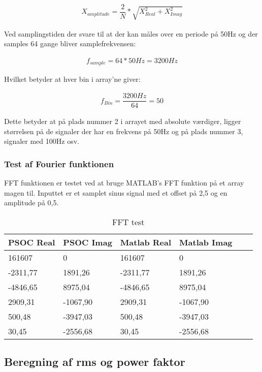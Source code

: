 \begin{align}
X_{amplitude} = \dfrac{2}{N}*\sqrt{X_{Real}^{2}+X_{Imag}^{2}}
\end{align} 	  


Ved samplingstiden der svare til at der kan måles over en periode på 50Hz og der samples 64 gange bliver samplefrekvensen:

\begin{align}
f_{sample} = 64 * 50Hz = 3200Hz
\end{align}   

Hvilket betyder at hver bin i array'ne giver:

\begin{align}
f_{Bin} = \dfrac{3200Hz}{64} = 50
\end{align}

Dette betyder at på plads nummer 2 i arrayet med absolute værdiger, ligger størrelsen på de signaler der har en frekvens på 50Hz og på plads nummer 3, signaler med 100Hz osv.

\subsubsection{Test af Fourier funktionen}
FFT funktionen er testet ved at bruge MATLAB's FFT funktion på et array magen til. Inputtet er et samplet sinus signal med et offset på 2,5 og en amplitude på 0,5.

\begin{table}[H] 
	\centering 
	\begin{tabular}{|l|l|l|l|l|l|} %
		\hline 	%
		PSOC Real				& PSOC Imag 	&Matlab Real    	&Matlab Imag 	 \\ \hline 	
		161607		&0				&161607		&0 	 \\ \hline 
		-2311,77	&1891,26		&-2311,77	&1891,26	 \\ \hline
		-4846,65	&8975,04		&-4846,65	&8975,04	 \\ \hline
		2909,31 	&-1067,90		&2909,31 	&-1067,90	 \\ \hline 
		500,48 		&-3947,03		&500,48 	&-3947,03	 \\ \hline 
		30,45		&-2556,68		&30,45		&-2556,68 \\ \hline   
	\end{tabular} 
	\caption{FFT test} 
	\label{tab:fftTest} 
\end{table}

\subsection{Beregning af rms og power faktor}

